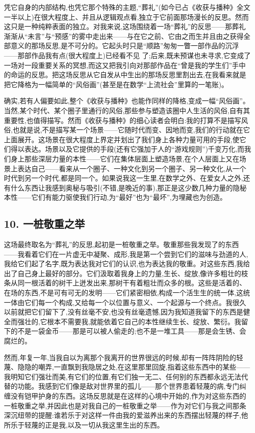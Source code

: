 凭它自身的内部结构,也凭它那个特殊的主题,“葬礼”(如今已占《收获与播种》全文一半以上)在很大程度上、并且从逻辑观点看,独立于它前面那场漫长的反思。然而这只是一种纯粹表面的独立。对我来说,这场围绕着一场“葬礼”的反思——那葬礼渐渐从“未言”与“预感”的雾中走出来——与在它之前、它由之而生并且由之获得全部意义的那场反思,是不可分的。它起头时只是“顺路”匆匆一瞥一部作品的沉浮——那部作品我有点(很大程度上)已经看不见
 了;后来,既未预谋也未寻求,它变成了一场对一段重要关系的冥想,而这又把我引向对那部作品在“曾是我的学生们”手中的命运的反思。把这场反思从它自发从中生出的那场反思里割出去,在我看来就是把它降格为一幅简单的“风俗画”(甚至是在数学“上流社会”里算的一笔账)。

 确实,若有人偏要如此,整个《收获与播种》也能作同样的降格,变成一幅“风俗画”。当然,某个时代、某个圈子里通行的风俗,那些参与塑造该圈中人生活的风俗,自有其重要性,也值得描写。然而《收获与播种》的细心读者会明白:我的打算不是描写风俗,也就是说,不是描写某一个场景——它随时代而变、因地而变,我们的行动就在它上面展开。这场景在很大程度上界定并划出了我们身上各种力量可用的手段,使它们得以表达。场景以及它提供的手段(还有它强加于人的“游戏规则”)千变万化,而我们身上那些深层力量的本性——它们在集体层面上塑造场景,在个人层面上又在场景上表达自己——看来从一个圈子、一种文化到另一个圈子、另一种文化,从一个时代到另一个时代,都是同一个。如果说我这一生里,在数学之外、在爱女人之外,还有什么东西让我感到奥秘与吸引(不错,是晚近的事),那正是这少数几种力量的隐秘本性——它们有能力驱使我们行动,为“最好”也为“最坏”,为埋藏也为创造。

\subsection{10. 一桩敬重之举}

这场最终取名为“葬礼”的反思,起初是一桩敬重之举。敬重那些我发现了的东西——我看着它们在一片虚无中凝聚、成形,我是第一个尝到它们的滋味与劲道的人,我给它们起了名字,既为表达我对它们的认识,也为表达我的敬重。对这些东西,我给出了自己身上最好的部分。它们汲取着我身上的力量,生长、绽放,像许多粗壮的枝条从同一根活着的树干上迸发出来,那树干有着粗壮而众多的根。这些是活着的、在场的东西,不是可有可无的发明——它们紧密相依,构成一个活生生的统一体,这统一体由它们每一个构成,又给每一个以位置与意义、一个起源与一个终点。我很久以前就把它们留下了,没有丝毫不安,也没有丝毫遗憾,因为我知道我留下的东西是健全而强壮的,它根本不需要我,就能依着它自己的本性继续生长、绽放、繁衍。我留下的不是一袋金币——那是可以被人偷走的;也不是一堆工具——那是会生锈、会腐烂的。

然而,年复一年,当我自以为离那个我离开的世界很远的时候,却有一阵阵阴险的轻蔑、隐隐的嘲弄,一直飘到我隐居之处,在这里那里回旋,指着这些东西中的某些——我明知它们强壮而美,有它们的位置,有它们独一无二、任何别的东西都永远无法代替的功能。我感到它们像是敌对世界里的孤儿——那个世界患着轻蔑的病,专门纠缠没有铠甲护身的东西。这场反思就是在这样的心境中开始的,作为对这些东西的一桩敬重之举,并因此也是对我自己的一桩敬重之举——作为对它们与我之间那条深沉纽带的提醒:谁若乐于对这样一件由我的爱滋养出来的东西摆出轻蔑的样子,他所乐于轻蔑的正是我,以及一切从我这里生出的东西。

